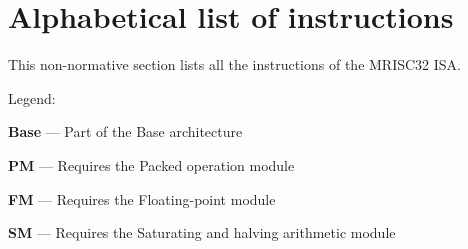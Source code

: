 %

\onecolumn

\chapter{Alphabetical list of instructions}

This non-normative section lists all the instructions of the MRISC32 ISA.

Legend:
\begin{bulletitems}
  \item{\textbf{Base} --- Part of the Base architecture}
  \item{\textbf{PM} --- Requires the Packed operation module}
  \item{\textbf{FM} --- Requires the Floating-point module}
  \item{\textbf{SM} --- Requires the Saturating and halving arithmetic module}
\end{bulletitems}



\twocolumn
